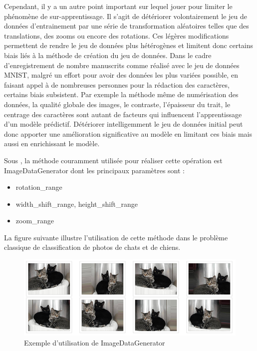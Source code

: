 Cependant, il y a un autre point important sur lequel jouer pour limiter le phénomène de
sur-apprentissage. Il s'agit de détériorer volontairement le jeu de données d'entrainement
par une série de transformation aléatoires telles que des translations, des zooms ou
encore des rotations. Ces légères modifications permettent de rendre le jeu de données 
plus hétérogènes et limitent donc certains biais liés à la méthode de création du jeu de
données. Dans le cadre d'enregistrement de nombre manuscrits comme réalisé avec le jeu de 
données MNIST, malgré un effort pour avoir des données les plus variées possible, en faisant
appel à de nombreuses personnes pour la rédaction des caractères, certains biais subsistent.
Par exemple la méthode même de numérisation des données, la qualité globale des images,
le contraste, l'épaisseur du trait, le centrage des caractères sont autant de facteurs qui 
influencent l'apprentissage d'un modèle prédictif. Détériorer intelligemment le jeu de
données initial peut donc apporter une amélioration significative au modèle en limitant 
ces biais mais aussi en enrichissant le modèle. 

Sous \Python {}, la méthode couramment utilisée pour réaliser cette opération
est ImageDataGenerator dont les principaux paramètres sont :

\begin{itemize}
\item rotation_range 
\item width_shift_range, height_shift_range
\item zoom_range
\end{itemize}

La figure suivante illustre l'utilisation
de cette méthode dans le problème classique de classification de photos de chats et de
chiens. 

\begin{figure}[h]
  \centering
  \includegraphics[scale=0.9]{assets/augmented-image}
  \caption{Exemple d'utilisation de ImageDataGenerator}
  \label{fig:augmented-image}
\end{figure}

